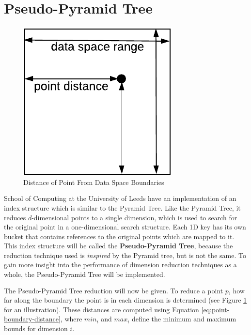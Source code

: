 \section{Pseudo-Pyramid Tree}

\begin{figure}
	\vspace{-5pt}
	\begin{center}
		\includegraphics[scale=0.7]{figures/pseudo-pyramid_tree_point_boundary_distances.pdf}
	\end{center}
	\vspace{-15pt}
	\caption{Distance of Point From Data Space Boundaries}
	\label{fig:point-boundary-distance}
\end{figure}

School of Computing at the University of Leeds have an implementation of an index structure which is similar to the Pyramid Tree. Like the Pyramid Tree, it reduces $d$-dimensional points to a single dimension, which is used to search for the original point in a one-dimensional search structure. Each 1D key has its own bucket that contains references to the original points which are mapped to it. This index structure will be called the \textbf{Pseudo-Pyramid Tree}, because the reduction technique used is \textit{inspired} by the Pyramid tree, but is not the same.  To gain more insight into the performance of dimension reduction techniques as a whole, the Pseudo-Pyramid Tree will be implemented.

The Pseudo-Pyramid Tree reduction will now be given. To reduce a point $p$, how far along the boundary the point is in each dimension is determined (see Figure \ref{fig:point-boundary-distance} for an illustration). These distances are computed using Equation \ref{eq:point-boundary-distance}, where  $min_i$ and $max_i$ define the minimum and maximum bounds for dimension $i$.

